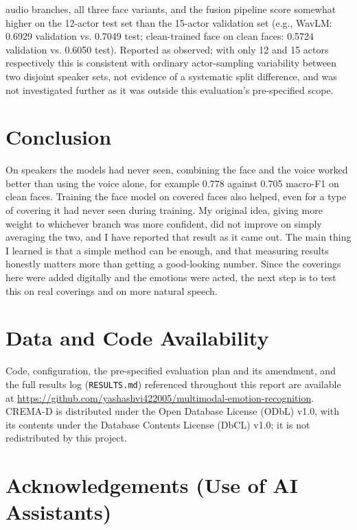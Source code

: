 \documentclass[10pt]{article}
\begin{document}
\begin{itemize}
  audio branches, all three face variants, and the fusion pipeline score somewhat higher on the 12-actor
  test set than the 15-actor validation set (e.g., WavLM: 0.6929 validation vs. 0.7049 test; clean-trained
  face on clean faces: 0.5724 validation vs. 0.6050 test). Reported as observed; with only 12 and 15
  actors respectively this is consistent with ordinary actor-sampling variability between two disjoint
  speaker sets, not evidence of a systematic split difference, and was not investigated further as it was
  outside this evaluation's pre-specified scope.
\end{itemize}

\section{Conclusion}

On speakers the models had never seen, combining the face and the voice worked better than using the
voice alone, for example 0.778 against 0.705 macro-F1 on clean faces. Training the face model on
covered faces also helped, even for a type of covering it had never seen during training. My original
idea, giving more weight to whichever branch was more confident, did not improve on simply averaging
the two, and I have reported that result as it came out. The main thing I learned is that a simple
method can be enough, and that measuring results honestly matters more than getting a good-looking
number. Since the coverings here were added digitally and the emotions were acted, the next step is to
test this on real coverings and on more natural speech.

\section{Data and Code Availability}
\label{sec:availability}

Code, configuration, the pre-specified evaluation plan and its amendment, and the full results log
(\texttt{RESULTS.md}) referenced throughout this report are available at
\url{https://github.com/yashashvi422005/multimodal-emotion-recognition}. CREMA-D \citep{cao2014cremad} is distributed under the Open
Database License (ODbL) v1.0, with its contents under the Database Contents License (DbCL) v1.0; it is
not redistributed by this project.

\section*{Acknowledgements (Use of AI Assistants)}
\end{document}
